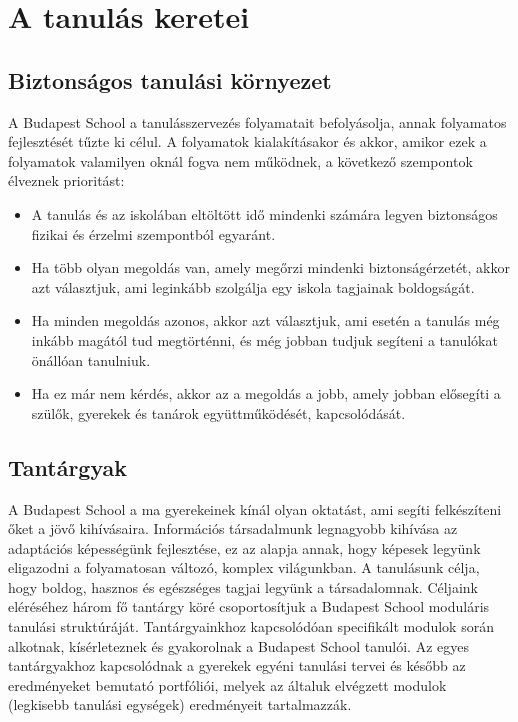 \chapter{A tanulás keretei}


\section{Biztonságos tanulási környezet}

A Budapest School a tanulásszervezés folyamatait befolyásolja, annak folyamatos fejlesztését tűzte ki célul. A folyamatok kialakításakor és akkor, amikor ezek a folyamatok valamilyen oknál fogva nem működnek, a következő szempontok élveznek prioritást:

\begin{itemize}
\item A tanulás és az iskolában eltöltött idő mindenki számára legyen biztonságos fizikai és érzelmi szempontból egyaránt.

\item Ha több olyan megoldás van, amely megőrzi mindenki biztonságérzetét, akkor azt választjuk, ami leginkább szolgálja egy iskola tagjainak boldogságát.

\item Ha minden megoldás azonos, akkor azt választjuk, ami esetén a tanulás még inkább magától tud megtörténni, és még jobban tudjuk segíteni a tanulókat önállóan tanulniuk.

\item Ha ez már nem kérdés, akkor az a megoldás a jobb, amely jobban elősegíti a szülők, gyerekek és tanárok együttműködését, kapcsolódását.
\end{itemize}


\section{Tantárgyak}
\label{sec:tantargyak}
A Budapest School a ma gyerekeinek kínál olyan oktatást, ami segíti felkészíteni őket a jövő kihívásaira. Információs társadalmunk legnagyobb kihívása az adaptációs képességünk fejlesztése, ez az alapja annak, hogy képesek legyünk eligazodni a folyamatosan változó, komplex világunkban. A tanulásunk célja, hogy boldog, hasznos és egészséges tagjai legyünk a társadalomnak. Céljaink eléréséhez három fő tantárgy köré csoportosítjuk a Budapest School moduláris tanulási struktúráját. Tantárgyainkhoz kapcsolódóan specifikált modulok során alkotnak, kísérleteznek és gyakorolnak a Budapest School tanulói. Az egyes tantárgyakhoz kapcsolódnak a gyerekek egyéni tanulási tervei és később az eredményeket bemutató portfóliói, melyek az általuk elvégzett modulok (legkisebb tanulási egységek) eredményeit tartalmazzák.

